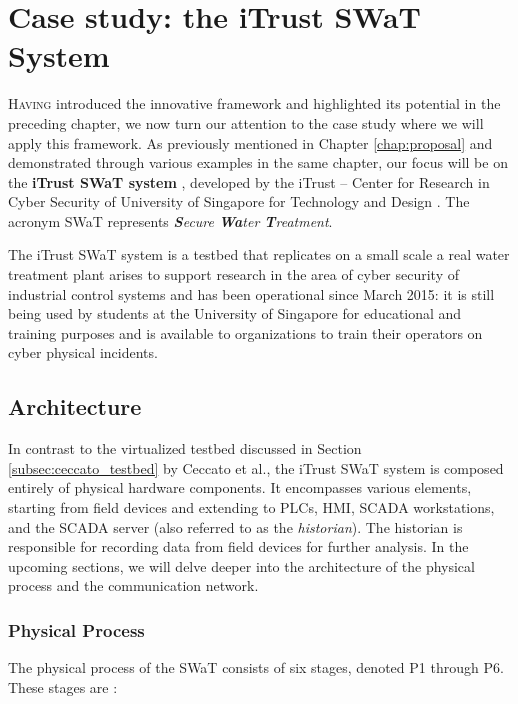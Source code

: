 \chapter{Case study: the iTrust SWaT System}
\label{casestudy}

\linenumbers
\lettrine[lines=2]{H}{aving} introduced the innovative framework and highlighted its potential in the preceding chapter, we now turn our attention to the case study where we will apply this framework. As previously mentioned in Chapter \ref{chap:proposal} and demonstrated through various examples in the same chapter, our focus will be on the \textbf{iTrust SWaT system} \cite{swat_home}, developed by the iTrust -- Center for Research in Cyber Security of University of Singapore for Technology and Design \cite{itrust_site}. The acronym SWaT represents \textit{\textbf{S}ecure \textbf{Wa}ter \textbf{T}reatment}.

\bigskip
The iTrust SWaT system is a testbed that replicates on a small scale a real water treatment plant arises to support research in the area of cyber security of industrial control systems and has been operational since March 2015: it is still being used by students at the University of Singapore for educational and training purposes and is available to organizations to train their operators on cyber physical incidents.

\section{Architecture}
\label{sec:5_swat_architecture}
In contrast to the virtualized testbed discussed in Section \ref{subsec:ceccato_testbed} by Ceccato et al., the iTrust SWaT system is composed entirely of physical hardware components. It encompasses various elements, starting from field devices and extending to PLCs, HMI, SCADA workstations, and the SCADA server (also referred to as the \textit{historian}). The historian is responsible for recording data from field devices for further analysis. In the upcoming sections, we will delve deeper into the architecture of the physical process and the communication network.

\subsection{Physical Process} 
\label{subsec:5_swat_physical_architecture}
The physical process of the SWaT consists of six stages, denoted P1 through P6. These stages are \cite{swat_tecnical_pdf}\cite{swat_tippenhauer}:

